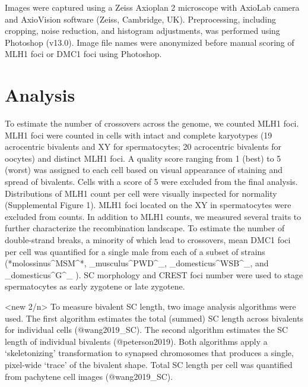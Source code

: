 \documentclass[9pt,lineno]{elife}
\begin{document}
Images were captured using a Zeiss Axioplan 2 microscope with AxioLab camera and AxioVision software (Zeiss, Cambridge, UK). Preprocessing, including cropping, noise reduction, and histogram adjustments, was performed using Photoshop (v13.0). Image file names were anonymized before manual scoring of MLH1 foci or DMC1 foci using Photoshop.

\section{Analysis}

To estimate the number of crossovers across the genome, we counted MLH1 foci. MLH1 foci were counted in cells with intact and complete karyotypes (19 acrocentric bivalents and XY for spermatocytes; 20 acrocentric bivalents for oocytes) and distinct MLH1 foci. A quality score ranging from 1 (best) to 5 (worst) was assigned to each cell based on visual appearance of staining and spread of bivalents. Cells with a score of 5 were excluded from the final analysis. Distributions of MLH1 count per cell were visually inspected for normality (Supplemental Figure 1). MLH1 foci located on the XY in spermatocytes were excluded from counts. In addition to MLH1 counts, we measured several traits to further characterize the recombination landscape. To estimate the number of double-strand breaks, a minority of which lead to crossovers, mean DMC1 foci per cell was quantified for a single male from each of a subset of strains (*molossinus^MSM^*, _musculus^PWD^_,  _domesticus^WSB^_, and _domesticus^G^_ ). SC morphology and CREST foci number were used to stage spermatocytes as early zygotene or late zygotene.

<new 2/n>
To measure bivalent SC length, two image analysis algorithms were used. The first algorithm estimates the total (summed) SC length across bivalents for individual cells (@wang2019_SC). The second algorithm estimates the SC length of individual bivalents (@peterson2019). Both algorithms apply a ‘skeletonizing’ transformation to synapsed chromosomes that produces a single, pixel-wide ‘trace’ of the bivalent shape. Total SC length per cell was quantified from pachytene cell images (@wang2019_SC). 
\end{document}
